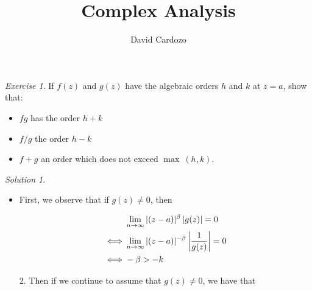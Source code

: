 \documentclass[notitlepage]{article}
\author{David Cardozo}
\title{Complex Analysis}
\theoremstyle{definition}
\theoremstyle{remark}
\newtheorem{exc}{Exercise}
\newtheorem*{sol}{Solution}
\begin{document}
\maketitle
\begin{exc}
	If $f(z)$ and $g(z)$ have the algebraic orders $h$ and $k$ at $z=a$, show that:
	\begin{itemize}
	\item $fg$ has the order $h+k$
	\item $f/g$ the order $h-k$
	\item  $f+g$ an order which does not exceed $\max\ (h,k)$.
	\end{itemize}
\end{exc}
\begin{sol}
	\begin{itemize}
		
		1. To say that $f(z)$ and $g(z)$ have algebraic orders $h$ and $k$ respectively at $z = a$ is to say that
		
		$$
		\lim_{n \to \infty} |(z-a)|^{\alpha} |f(z)| = 0 \text{ for all } \alpha > r
		$$
		
		and
		
		$$
		\lim_{n \to \infty} |(z-a)|^{\beta} |g(z)| = 0 \text{ for all } \beta > k
		$$
		
		where $h$ and $k$ are the minimal integers satisfying these properties.
		
		2. Then we have that
		
		\begin{align*}
		& \lim_{n \to \infty} |(z-a)|^{\alpha+\beta} |f(z) \cdot g(z)| = 0 \\
		\iff & \lim_{n \to \infty} |(z-a)|^{\alpha} |(z-a)|^{\beta} |f(z) \cdot g(z)| = 0\\
		\iff & \alpha + \beta > h + k \\
		\end{align*}
		
		as desired.
		\item First, we observe that if $g(z) \ne 0$, then
		
		\begin{align*}
		& \lim_{n \to \infty}  |(z-a)|^{\beta} \left|g(z)\right| = 0 \\
		\iff & \lim_{n \to \infty} |(z-a)|^{-\beta} \left|{1 \over g(z)}\right| = 0 \\
		\iff & - \beta > - k \\
		\end{align*}
		
		2. Then if we continue to assume that $g(z) \ne 0$, we have that
		

\end{itemize}
\end{sol}
\end{document}
